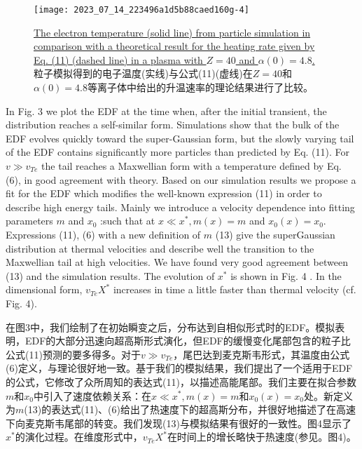 \documentclass[oneside,onecolumn]{article}
\newcommand\enzhbox[2]{
	\quad\par \begin{paracol}{2} 
			\begin{spacing}{1.0}
					\footnotesize  #1
			\end{spacing}
			
		\switchcolumn[1] 
		#2
	\end{paracol} 
}
\begin{document}
\begin{sloppypar}
  \begin{figure}[tbp]
  	\centering
  	\texttt{[image: 2023\_07\_14\_223496a1d5b88caed160g-4]}
  	\caption{\uline{The electron temperature (solid line) from particle simulation in comparison with a theoretical result for the heating rate given by Eq. (11) (dashed line) in a plasma with $Z=40$ and $\alpha(0)=4.8$.}\\粒子模拟得到的电子温度(实线)与公式(11)(虚线)在$Z=40$和$\alpha(0)=4.8$等离子体中给出的升温速率的理论结果进行了比较。}
  	\label{figure2}
  \end{figure}
  
  

\enzhbox{  In Fig. 3 we plot the EDF at the time when, after the initial transient, the distribution reaches a self-similar form. Simulations show that the bulk of the EDF evolves quickly toward the super-Gaussian form, but the slowly varying tail of the EDF contains significantly more particles than predicted by Eq. (11). For $v \gg v_{T e}$ the tail reaches a Maxwellian form with a temperature defined by Eq. (6), in good agreement with theory. Based on our simulation results we propose a fit for the EDF which modifies the well-known expression (11) in order to describe high energy tails. Mainly we introduce a velocity dependence into fitting parameters $m$ and $x_{0}$ :such that at $x \ll x^{*}, m(x)=m$ and $x_{0}(x)=x_{0}$. Expressions (11), (6) with a new definition of $m$ (13) give the superGaussian distribution at thermal velocities and describe well the transition to the Maxwellian tail at high velocities. We have found very good agreement between (13) and the simulation results. The evolution of $x^{*}$ is shown in Fig. 4 . In the dimensional form, $v_{T e} X^{*}$ increases in time a little faster than thermal velocity (cf. Fig. 4).
}{
在图3中，我们绘制了在初始瞬变之后，分布达到自相似形式时的EDF。模拟表明，EDF的大部分迅速向超高斯形式演化，但EDF的缓慢变化尾部包含的粒子比公式(11)预测的要多得多。对于$v \gg v_{T e}$，尾巴达到麦克斯韦形式，其温度由公式(6)定义，与理论很好地一致。基于我们的模拟结果，我们提出了一个适用于EDF的公式，它修改了众所周知的表达式(11)，以描述高能尾部。我们主要在拟合参数$m$和$x_{0}$中引入了速度依赖关系：在$x \ll x^{*}, m(x)=m$和$x_{0}(x)=x_{0}$处。新定义为$m$(13)的表达式(11)、(6)给出了热速度下的超高斯分布，并很好地描述了在高速下向麦克斯韦尾部的转变。我们发现(13)与模拟结果有很好的一致性。图4显示了$x^{*}$的演化过程。在维度形式中，$v_{T e} X^{*}$在时间上的增长略快于热速度(参见。图4)。
}


\end{sloppypar}
\end{document}
